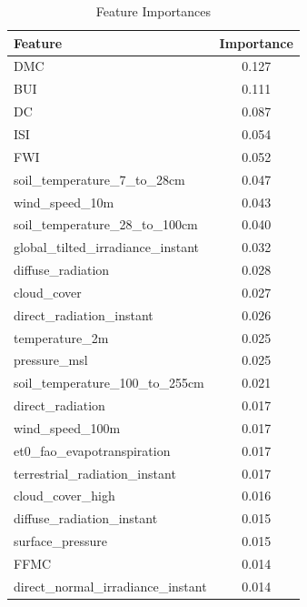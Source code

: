 \begin{table}[H]
	\caption{Feature Importances}
	\centering
	\label{feature_importances}
	\begin{tabular}{lc}
		\hline
		Feature                                & Importance \\ \hline
		DMC                                        & 0.127       \\ 
		BUI                                        & 0.111       \\ 
		DC                                         & 0.087       \\ 
		ISI                                       & 0.054       \\ 
		FWI                                     & 0.052       \\ 
		soil\_temperature\_7\_to\_28cm        & 0.047       \\ 
		wind\_speed\_10m                      & 0.043       \\ 
		soil\_temperature\_28\_to\_100cm       & 0.040       \\ 
		global\_tilted\_irradiance\_instant     & 0.032       \\ 
		diffuse\_radiation                     & 0.028       \\ 
		cloud\_cover                           & 0.027       \\ 
		direct\_radiation\_instant             & 0.026       \\ 
		temperature\_2m                       & 0.025       \\ 
		pressure\_msl                         & 0.025       \\ 
		soil\_temperature\_100\_to\_255cm       & 0.021       \\ 
		direct\_radiation                      & 0.017       \\ 
		wind\_speed\_100m                      & 0.017       \\ 
		et0\_fao\_evapotranspiration         & 0.017       \\ 
		terrestrial\_radiation\_instant           & 0.017       \\ 
		cloud\_cover\_high                     & 0.016       \\ 
		diffuse\_radiation\_instant           & 0.015       \\ 
		surface\_pressure                     & 0.015       \\ 
		FFMC                                       & 0.014       \\ 
		direct\_normal\_irradiance\_instant   & 0.014       \\ 

\end{tabular}
\end{table}
